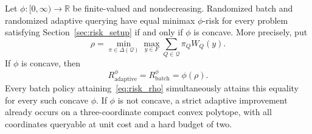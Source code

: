 \begin{theorem}
\label{prop:risk_classification}
Let $\phi:[0,\infty)\to\mathbb R$ be finite-valued and nondecreasing.
Randomized batch and randomized adaptive querying have equal minimax
$\phi$-risk for every problem satisfying Section~\ref{sec:risk_setup}
if and only if $\phi$ is concave. More precisely, put
\begin{equation}
 \rho=\min_{\pi\in\Delta(\mathcal Q)}\max_{y\in F}
         \sum_{Q\in\mathcal Q}\pi_Q W_Q(y).
 \label{eq:risk_rho}
\end{equation}
If $\phi$ is concave, then
\begin{equation}
 R_{\mathrm{adaptive}}^{\phi}
 =R_{\mathrm{batch}}^{\phi}=\phi(\rho).
 \label{eq:risk_concave_value}
\end{equation}
Every batch policy attaining~\eqref{eq:risk_rho} simultaneously attains
this equality for every such concave $\phi$. If $\phi$ is not concave,
a strict adaptive improvement already occurs on a three-coordinate
compact convex polytope, with all coordinates queryable at unit cost
and a hard budget of two.
\end{theorem}
